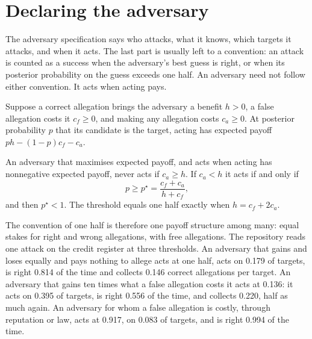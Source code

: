 \section{Declaring the adversary}\label{c07:sec-adversary}

The adversary specification says who attacks, what it knows, which targets it
attacks, and when it acts. The last part is usually left to a convention: an
attack is counted as a success when the adversary's best guess is right, or when
its posterior probability on the guess exceeds one half. An adversary need not
follow either convention. It acts when acting pays.

Suppose a correct allegation brings the adversary a benefit $h > 0$, a false
allegation costs it $c_f \ge 0$, and making any allegation costs $c_a \ge 0$. At
posterior probability $p$ that its candidate is the target, acting has expected
payoff $ph - (1-p)c_f - c_a$.

\begin{proposition}\label{c07:prop-attack}
An adversary that maximises expected payoff, and acts when acting has nonnegative
expected payoff, never acts if $c_a \ge h$. If $c_a < h$ it acts if and only if
\begin{equation}\label{c07:eq-attack}
p \ge p^\star = \frac{c_f + c_a}{h + c_f},
\end{equation}
and then $p^\star < 1$. The threshold equals one half exactly when $h = c_f + 2c_a$.
\end{proposition}

The convention of one half is therefore one payoff structure among many: equal
stakes for right and wrong allegations, with free allegations. The repository reads
one attack on the credit register at three thresholds. An adversary that gains and
loses equally and pays nothing to allege acts at one half, acts on 0.179 of
targets, is right 0.814 of the time and collects 0.146 correct allegations per
target. An adversary that gains ten times what a false allegation costs it acts at
0.136: it acts on 0.395 of targets, is right 0.556 of the time, and collects 0.220,
half as much again. An adversary for whom a false allegation is costly, through
reputation or law, acts at 0.917, on 0.083 of targets, and is right 0.994 of the
time.

